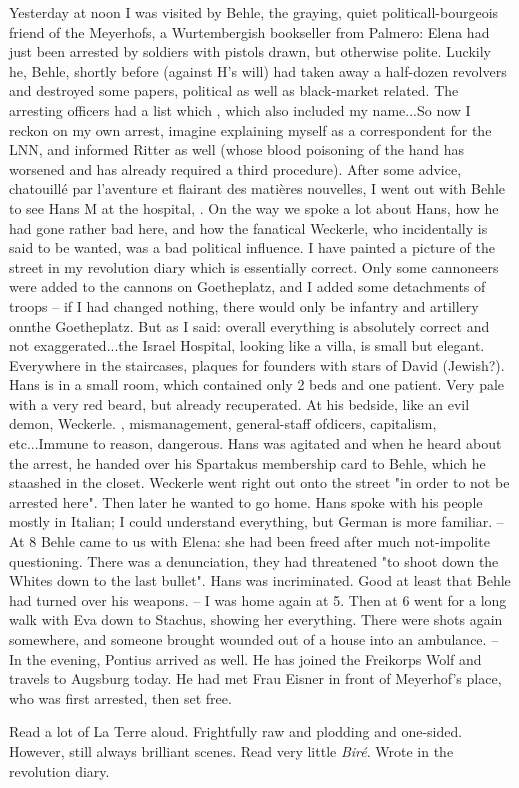 
Yesterday at noon I was visited by Behle, the graying, quiet politicall-bourgeois friend of the Meyerhofs, a Wurtembergish bookseller from Palmero: Elena had just been arrested by soldiers with pistols drawn, but otherwise polite. Luckily he, Behle, shortly before (against H's will) had taken away a half-dozen revolvers and destroyed some papers, political as well as black-market related. The arresting officers had a list which , which also included my name...So now I reckon on my own arrest, imagine explaining myself as a correspondent for the LNN, and informed Ritter as well (whose blood poisoning of the hand has worsened and has already required a third procedure). After some advice, chatouillé par l'aventure et flairant des matières nouvelles, I went out with Behle to see Hans M at the hospital, . On the way we spoke a lot about Hans, how he had gone rather bad here, and how the fanatical Weckerle, who incidentally is said to be wanted, was a bad political influence. I have painted a picture of the street in my revolution diary which is essentially correct. Only some cannoneers were added to the cannons on Goetheplatz, and I added some detachments of troops -- if I had changed nothing, there would only be infantry and artillery onnthe Goetheplatz. But as I said: overall everything is absolutely correct and not exaggerated...the Israel Hospital, looking like a villa, is small but elegant. Everywhere in the staircases, plaques for founders with stars of David (Jewish?). Hans is in a small room, which contained only 2 beds and one patient. Very pale with a very red beard, but already recuperated. At his bedside, like an evil demon, Weckerle. , mismanagement, general-staff ofdicers, capitalism, etc...Immune to reason, dangerous. Hans was agitated and  when he heard about the arrest, he handed over his Spartakus membership card to Behle, which he staashed in the closet. Weckerle went right out onto the street "in order to not be arrested here". Then later he wanted to go home. Hans spoke with his people mostly in Italian; I could understand everything, but German is more familiar. -- At 8 Behle came to us with Elena: she had been freed after much not-impolite questioning. There was a denunciation, they had threatened "to shoot down the Whites down to the last bullet". Hans was incriminated. Good at least that Behle had turned over his weapons. -- I was home again at 5. Then at 6 went for a long walk with Eva down to Stachus, showing her everything. There were shots again somewhere, and someone brought wounded out of a house into an ambulance. -- In the evening, Pontius arrived as well. He has joined the Freikorps Wolf and travels to Augsburg today. He had met Frau Eisner in front of Meyerhof's place, who was first arrested, then set free.

Read a lot of La Terre aloud. Frightfully raw and plodding and one-sided. However, still always brilliant scenes. Read very little \textit{Biré}. Wrote in the revolution diary.
